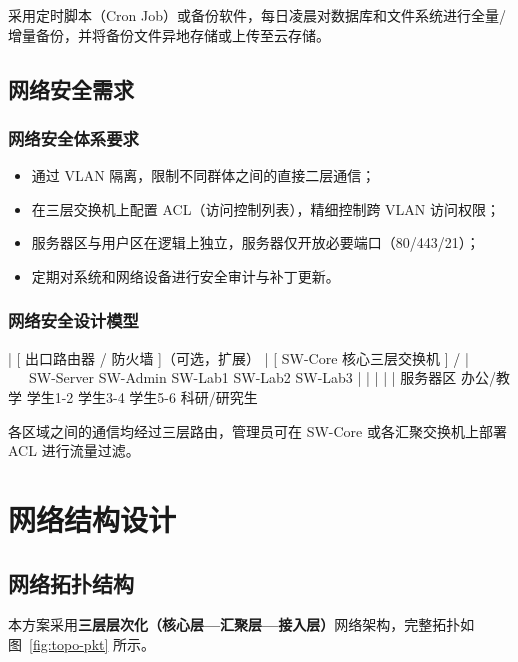 \documentclass[12pt,a4paper]{ctexart}
\begin{document}
采用定时脚本（Cron Job）或备份软件，每日凌晨对数据库和文件系统进行全量/增量备份，并将备份文件异地存储或上传至云存储。

\subsection{网络安全需求}

\subsubsection{网络安全体系要求}

\begin{itemize}
  \item 通过 VLAN 隔离，限制不同群体之间的直接二层通信；
  \item 在三层交换机上配置 ACL（访问控制列表），精细控制跨 VLAN 访问权限；
  \item 服务器区与用户区在逻辑上独立，服务器仅开放必要端口（80/443/21）；
  \item 定期对系统和网络设备进行安全审计与补丁更新。
\end{itemize}

\subsubsection{网络安全设计模型}

\begin{codeblock}
[ 外部互联网 ]
       |
   [ 出口路由器 / 防火墙 ]（可选，扩展）
       |
   [ SW-Core 核心三层交换机 ]
    /    |    \    \    \
SW-Server SW-Admin SW-Lab1 SW-Lab2 SW-Lab3
   |         |        |       |       |
 服务器区  办公/教学  学生1-2  学生3-4  学生5-6
         科研/研究生
\end{codeblock}

各区域之间的通信均经过三层路由，管理员可在 SW-Core 或各汇聚交换机上部署 ACL 进行流量过滤。

\section{网络结构设计}

\subsection{网络拓扑结构}

本方案采用\textbf{三层层次化（核心层—汇聚层—接入层）}网络架构，完整拓扑如图~\ref{fig:topo-pkt} 所示。
\end{document}
